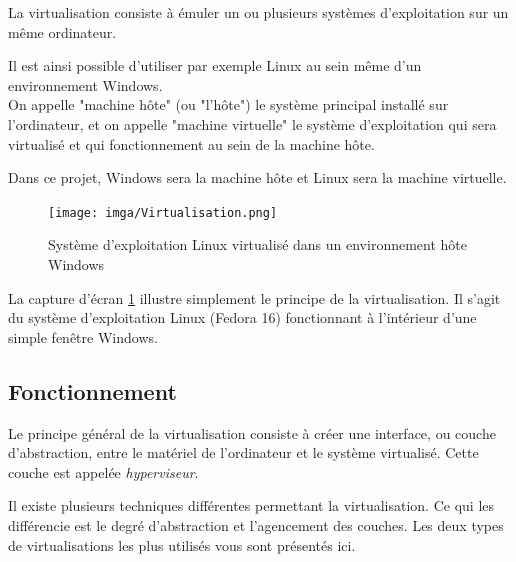 La virtualisation consiste à émuler un ou plusieurs systèmes d'exploitation sur un même ordinateur.

Il est ainsi possible d'utiliser par exemple Linux au sein même d'un environnement Windows.
\\


On appelle "machine hôte" (ou "l'hôte") le système principal installé sur l'ordinateur, et on appelle "machine virtuelle" le système d'exploitation qui sera virtualisé et qui fonctionnement au sein de la machine hôte.

Dans ce projet, Windows sera la machine hôte et Linux sera la machine virtuelle.
\\


\begin{figure}[!h]
	\center
	\texttt{[image: imga/Virtualisation.png]}
	\caption{Système d'exploitation Linux virtualisé dans un environnement hôte Windows}
	\label{Screenshot Virtualisation}
\end{figure}

La capture d'écran \ref{Screenshot Virtualisation} illustre simplement le principe de la virtualisation.
Il s'agit du système d'exploitation Linux (Fedora 16) fonctionnant à l'intérieur d'une simple fenêtre Windows.
\\





\subsection{Fonctionnement}

Le principe général de la virtualisation consiste à créer une interface, ou couche d'abstraction, entre le matériel de l'ordinateur et le système virtualisé.
Cette couche est appelée \textit{hyperviseur}.

Il existe plusieurs techniques différentes permettant la virtualisation.
Ce qui les différencie est le degré d'abstraction et l'agencement des couches.
Les deux types de virtualisations les plus utilisés vous sont présentés ici. 
\\




